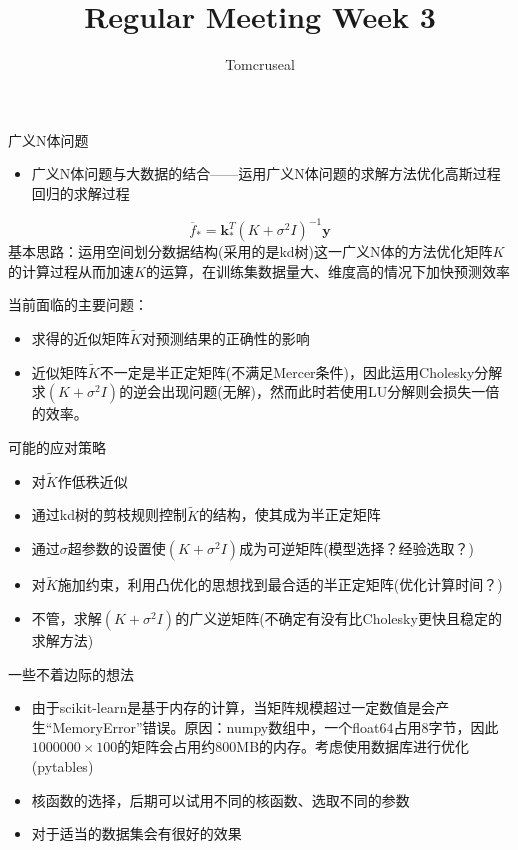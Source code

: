 \documentclass{beamer}
\author{Tomcruseal}
\title{Regular Meeting Week 3}
\institute{School of Computer Science and Technology SCUT }
\begin{document}
	
	\frame{\titlepage}
	
	

    
    \begin{frame}广义N体问题
    	\begin{itemize}
    		\item 广义N体问题与大数据的结合——运用广义N体问题的求解方法优化高斯过程回归的求解过程
    	\end{itemize}
        $$\overline{f}_{*}=\textbf{k}_{*}^{T}(K+\sigma^2 I)^{-1}\textbf{y}$$
        基本思路：运用空间划分数据结构(采用的是kd树)这一广义N体的方法优化矩阵$K$的计算过程从而加速$K$的运算，在训练集数据量大、维度高的情况下加快预测效率
    \end{frame}
    
    \begin{frame}当前面临的主要问题：
    	\begin{itemize}
    		\item 求得的近似矩阵$\tilde{K}$对预测结果的正确性的影响
    		\item 近似矩阵$\tilde{K}$不一定是半正定矩阵(不满足Mercer条件)，因此运用Cholesky分解求$(K+\sigma^2 I)$的逆会出现问题(无解)，然而此时若使用LU分解则会损失一倍的效率。
    	
        \end{itemize}
    \end{frame}

    \begin{frame}可能的应对策略
        \begin{itemize}
        	\item 对$\tilde{K}$作低秩近似
        	\item 通过kd树的剪枝规则控制$\tilde{K}$的结构，使其成为半正定矩阵
        	\item 通过$\sigma$超参数的设置使$(K+\sigma^2 I)$成为可逆矩阵(模型选择？经验选取？)
        	\item 对$\tilde{K}$施加约束，利用凸优化的思想找到最合适的半正定矩阵(优化计算时间？)
        	\item 不管，求解$(K+\sigma^2 I)$的广义逆矩阵(不确定有没有比Cholesky更快且稳定的求解方法)
        \end{itemize}
    \end{frame}

    \begin{frame}一些不着边际的想法
    	\begin{itemize}
    	    \item 由于scikit-learn是基于内存的计算，当矩阵规模超过一定数值是会产生“MemoryError”错误。原因：numpy数组中，一个float64占用8字节，因此$1000000\times100$的矩阵会占用约800MB的内存。考虑使用数据库进行优化(pytables)
    	    \item 核函数的选择，后期可以试用不同的核函数、选取不同的参数
    	    \item 对于适当的数据集会有很好的效果	
    	\end{itemize}
        
    \end{frame}
\end{document}

